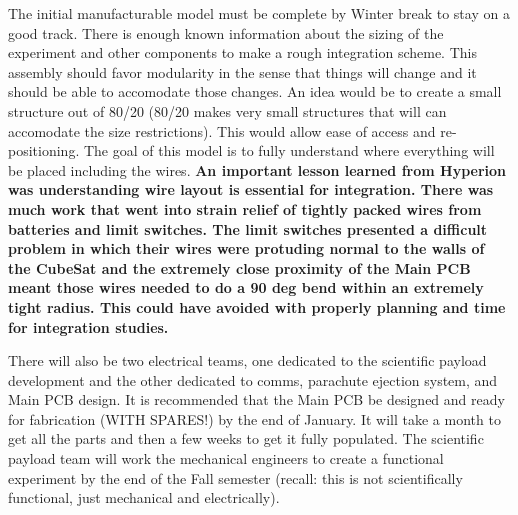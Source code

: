\documentclass[conference]{IEEEtran} %
\begin{document}
  The initial manufacturable model must be complete by Winter break to stay on a good track. There is enough known information about the sizing of the experiment and other components 
  to make a rough integration scheme. This assembly should favor modularity in the sense that things will change and it should be able to accomodate those changes. An idea would be 
  to create a small structure out of 80/20 (80/20 makes very small structures that will can accomodate the size restrictions). This would allow ease of access and re-positioning. 
  The goal of this model is to fully understand where everything will be placed including the wires. \textbf{An important lesson learned from Hyperion was understanding wire layout is 
  essential for integration. There was much work that went into strain relief of tightly packed wires from batteries and limit switches. The limit switches presented a difficult problem 
  in which their wires were protuding normal to the walls of the CubeSat and the extremely close proximity of the Main PCB meant those wires needed to do a 90 deg bend within an extremely 
  tight radius. This could have avoided with properly planning and time for integration studies.}

  There will also be two electrical teams, one dedicated to the scientific payload development and the other dedicated to comms, parachute ejection system, and Main PCB design. It is 
  recommended that the Main PCB be designed and ready for fabrication (WITH SPARES!) by the end of January. It will take a month to get all the parts and then a few weeks to get it fully populated. 
  The scientific payload team will work the mechanical engineers to create a functional experiment by the end of the Fall semester (recall: this is not scientifically functional, just mechanical and 
  electrically). 
\end{document}
